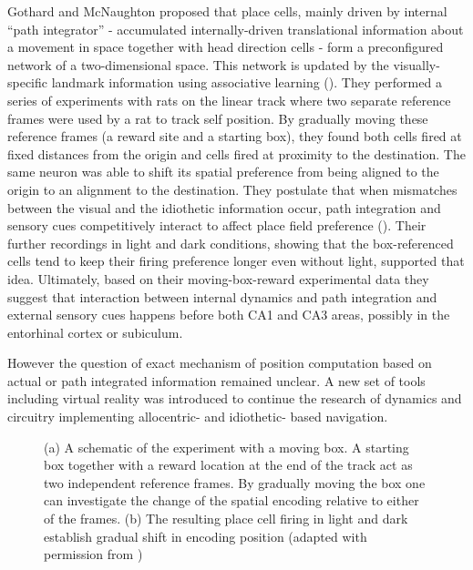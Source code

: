 Gothard and McNaughton proposed that place cells, mainly driven by internal “path integrator” - accumulated internally-driven translational information about a movement in space together with head direction cells - form a preconfigured network of a two-dimensional space. This network is updated by the visually-specific landmark information using associative learning (\cite{Mcnaughton1996}). They performed a series of experiments with rats on the linear track where two separate reference frames were used by a rat to track self position. By gradually moving these reference frames (a reward site and a starting box), they found both cells fired at fixed distances from the origin and cells fired at proximity to the destination. The same neuron was able to shift its spatial preference from being aligned to the origin to an alignment to the destination. They postulate that when mismatches between the visual and the idiothetic information occur, path integration and sensory cues competitively interact to affect place field preference (\cite{Gothard1996}). Their further recordings in light and dark conditions, showing that the box-referenced cells tend to keep their firing preference longer even without light, supported that idea. Ultimately, based on their moving-box-reward experimental data they suggest that interaction between internal dynamics and path integration and external sensory cues happens before both CA1 and CA3 areas, possibly in the entorhinal cortex or subiculum.

However the question of exact mechanism of position computation based on actual or path integrated information remained unclear. A new set of tools including virtual reality was introduced to continue the research of dynamics and circuitry implementing allocentric- and idiothetic- based navigation.


\begin{figure}
\captionsetup{format=plain}
\caption[Moving box]{
(a) A schematic of the experiment with a moving box. A starting box together with a reward location at the end of the track act as two independent reference frames. By gradually moving the box one can investigate the change of the spatial encoding relative to either of the frames. (b) The resulting place cell firing in light and dark establish gradual shift in encoding position (adapted with permission from \cite{McNaughton2006})
}
\label{fig:F4_moving_box}
\end{figure}


